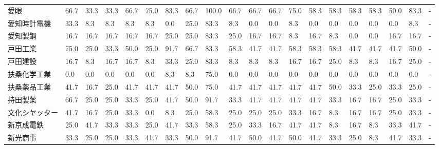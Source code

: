 \begin{tabular}{llllllllllllllllllll}
愛眼              &   66.7 &   33.3 &      33.3 &      66.7 &       75.0 &   83.3 &   66.7 &  100.0 &    66.7 &    66.7 &   66.7 &  75.0 &   58.3 &    58.3 &    58.3 &  58.3 &  50.0 &  83.3 &     - \\
愛知時計電機          &   33.3 &    8.3 &       8.3 &       8.3 &        8.3 &    0.0 &   25.0 &   83.3 &     8.3 &     0.0 &    0.0 &   8.3 &    0.0 &     0.0 &     0.0 &   0.0 &   0.0 &   8.3 &     - \\
愛知製鋼            &   16.7 &   16.7 &      16.7 &      16.7 &       16.7 &   25.0 &   25.0 &   83.3 &    25.0 &    16.7 &   16.7 &   8.3 &   16.7 &     8.3 &     0.0 &   0.0 &  16.7 &  16.7 &     - \\
戸田工業            &   75.0 &   25.0 &      33.3 &      50.0 &       25.0 &   91.7 &   66.7 &   83.3 &    58.3 &    41.7 &   41.7 &  58.3 &   58.3 &    58.3 &    41.7 &  41.7 &  41.7 &  50.0 &     - \\
戸田建設            &   16.7 &    8.3 &      16.7 &      16.7 &        8.3 &   33.3 &   25.0 &   83.3 &     8.3 &     8.3 &    8.3 &  16.7 &   16.7 &    25.0 &     8.3 &   8.3 &  16.7 &  25.0 &     - \\
扶桑化学工業          &    0.0 &    0.0 &       0.0 &       0.0 &        0.0 &    8.3 &    8.3 &   75.0 &     0.0 &     0.0 &    0.0 &   0.0 &    0.0 &     0.0 &     0.0 &   0.0 &   0.0 &   0.0 &     - \\
扶桑薬品工業          &   41.7 &   16.7 &      25.0 &      41.7 &       41.7 &   41.7 &   50.0 &   75.0 &    41.7 &    41.7 &   41.7 &  41.7 &   41.7 &    50.0 &    33.3 &  25.0 &  33.3 &  25.0 &     - \\
持田製薬            &   66.7 &   25.0 &      25.0 &      33.3 &       25.0 &   41.7 &   50.0 &   91.7 &    33.3 &    41.7 &   41.7 &  41.7 &   41.7 &    33.3 &    16.7 &  16.7 &  25.0 &  33.3 &     - \\
文化シヤッター         &   41.7 &   16.7 &      25.0 &      33.3 &        0.0 &    8.3 &   25.0 &   58.3 &    25.0 &    25.0 &   25.0 &  33.3 &   16.7 &     8.3 &    16.7 &  16.7 &  25.0 &  33.3 &     - \\
新京成電鉄           &   25.0 &   41.7 &      33.3 &      33.3 &       25.0 &   41.7 &   33.3 &   58.3 &    25.0 &    33.3 &   16.7 &  41.7 &   41.7 &     8.3 &    16.7 &   8.3 &  33.3 &  41.7 &     - \\
新光商事            &   33.3 &   25.0 &      25.0 &      33.3 &       41.7 &   33.3 &   50.0 &   91.7 &    41.7 &    50.0 &   41.7 &  50.0 &   41.7 &    33.3 &    25.0 &   8.3 &  41.7 &  33.3 &     - \\

\end{tabular}
